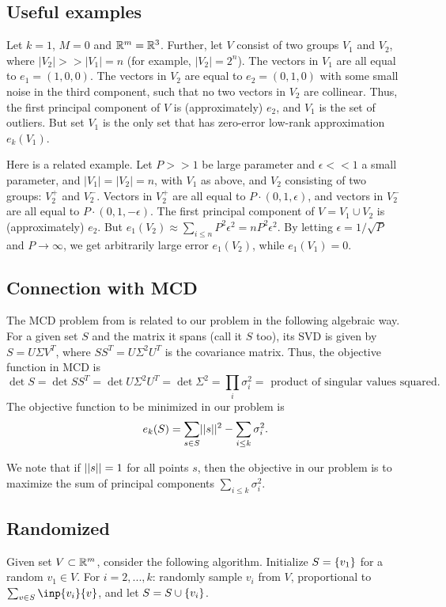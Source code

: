 \documentclass{article}
\begin{document}
\subsection{Useful examples}
Let $k = 1$, $M = 0$ and $\mathbb{R}^m = \mathbb{R}^3$. Further, let $V$ consist of two groups $V_1$ and $V_2$, where $|V_2| >> |V_1| = n$ (for example, $|V_2|=2^n$). The vectors in $V_1$ are all equal to $e_1 = (1,0,0)$. The vectors in $V_2$ are equal to $e_2=(0,1,0)$ with some small noise in the third component, such that no two vectors in $V_2$ are collinear. Thus, the first principal component of $V$ is (approximately) $e_2$, and $V_1$ is the set of outliers. But set $V_1$ is the only set that has zero-error low-rank approximation $e_k(V_1)$.

Here is a related example. Let $P >> 1$ be large parameter and $\epsilon << 1$ a small parameter, and $|V_1| = |V_2| = n$, with $V_1$ as above, and $V_2$ consisting of two groups: $V_2^+$ and $V_2^-$. Vectors in $V_2^+$ are all equal to $P\cdot(0,1,\epsilon)$, and vectors in $V_2^-$ are all equal to $P\cdot(0,1,-\epsilon)$. The first principal component of $V = V_1\cup V_2$ is (approximately) $e_2$. But $e_1(V_2) \approx \sum_{i\leq n}P^2\epsilon^2 = n P^2\epsilon^2$. By letting $\epsilon = 1/\sqrt{P}$ and $P\to \infty$, we get arbitrarily large error $e_1(V_2)$, while $e_1(V_1) = 0$.

\subsection{Connection with MCD}
The MCD problem from \cite{bernholt2004complexity} is related to our problem in the following algebraic way. For a given set $S$ and the matrix it spans (call it $S$ too), its SVD is given by $S = U \Sigma V^T$, where $SS^T = U \Sigma^2 U^T$ is the covariance matrix. Thus, the objective function in MCD is $$\det{S} = \det{SS^T} = \det{U \Sigma^2 U^T} = \det{\Sigma^2} = \prod_{i}\sigma_i^2 = \text{ product of singular values squared}.$$ The objective function to be minimized in our problem is $$e_k(S) = \sum_{s\in S}\norm{s}^2 - \sum_{i\leq k}\sigma_i^2.$$

We note that if $||s|| = 1$ for all points $s$, then the objective in our problem is to maximize the sum of principal components $\sum_{i\leq k}\sigma_i^2$.

\subsection{Randomized}
Given set $V \subset \mathbb{R}^m$, consider the following algorithm.
Initialize $S = \left\{v_1\right\}$ for a random $v_1\in V$. For $i=2,...,k$: randomly sample $v_i$ from $V$, proportional to $\sum_{v\in S}\inp{v_i}{v}$, and let $S = S\cup \left\{v_i\right\}$. 
\end{document}
